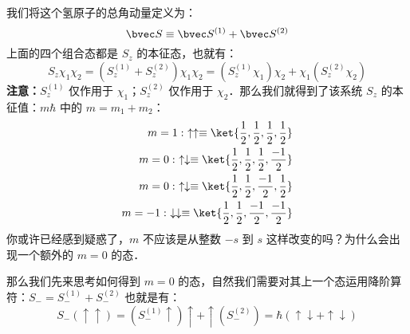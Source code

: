 我们将这个氢原子的总角动量定义为：
\begin{equation}
\bvec S \equiv \bvec S^{(1)}+\bvec S^{(2)}
\end{equation}
上面的四个组合态都是 $S_z$ 的本征态，也就有：
\begin{equation}
S_z\chi_1\chi_2=(S_z^{(1)}+S_z^{(2)})\chi_1\chi_2=(S_z^{(1)}\chi_1)\chi_2+\chi_1(S_z^{(2)}\chi_2)
\end{equation}
\textbf{注意：}$S_z^{(1)}$ 仅作用于 $\chi_1$；$S_z^{(2)}$ 仅作用于 $\chi_2$．那么我们就得到了该系统 $S_z$ 的本征值：$m\hbar$ 中的 $m=m_1+m_2$：
\begin{align}
m=1: \ \uparrow\uparrow\equiv \ket{\frac{1}{2},\frac{1}{2},\frac{1}{2},\frac{1}{2}}\\
m=0: \ \uparrow\downarrow\equiv \ket{\frac{1}{2},\frac{1}{2},\frac{1}{2},\frac{-1}{2}}\\
m=0: \ \uparrow\downarrow\equiv \ket{\frac{1}{2},\frac{1}{2},\frac{-1}{2},\frac{1}{2}}\\ 
m=-1:\ \downarrow\downarrow\equiv \ket{\frac{1}{2},\frac{1}{2},\frac{-1}{2},\frac{-1}{2}}
\end{align}
你或许已经感到疑惑了，$m$ 不应该是从整数 $-s$ 到 $s$ 这样改变的吗？为什么会出现一个额外的 $m=0$ 的态．

那么我们先来思考如何得到 $m=0$ 的态，自然我们需要对其上一个态运用降阶算符：$S_-=S_-^{(1)}+S_-^{(2)}$ 也就是有：
\begin{equation}
S_-(\uparrow\uparrow)=(S_-^{(1)}\uparrow)\uparrow+\uparrow(S_-^{(2)})=\hbar(\uparrow\downarrow+\uparrow\downarrow)
\end{equation}

